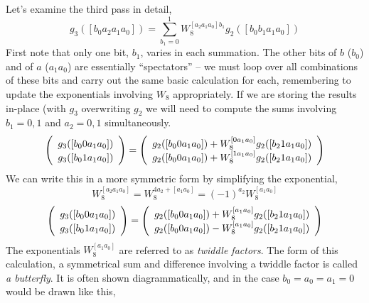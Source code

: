 \documentclass[fleqn,12pt]{article}
\begin{document}
Let's examine the third pass in detail,
%
\begin{equation}
g_3([b_0 a_2 a_1 a_0]) 
=
\sum_{b_1=0}^{1} W_8^{[a_2 a_1 a_0] b_1} g_2([b_0 b_1 a_1 a_0])
\end{equation}
%
First note that only one bit, $b_1$, varies in each summation.  The
other bits of $b$ ($b_0$) and of $a$ ($a_1 a_0$) are essentially
``spectators'' -- we must loop over all combinations of these bits and
carry out the same basic calculation for each, remembering to update
the exponentials involving $W_8$ appropriately.  If we are storing the
results in-place (with $g_3$ overwriting $g_2$ we will need to compute
the sums involving $b_1=0,1$ and $a_2=0,1$ simultaneously.
%
\begin{equation}
\left(
\begin{array}{c}
g_3([b_0 0 a_1 a_0]) \vphantom{W_8^{[]}} \\
g_3([b_0 1 a_1 a_0]) \vphantom{W_8^{[]}} 
\end{array}
\right)
=
\left(
\begin{array}{c}
g_2([b_0 0 a_1 a_0]) + W_8^{[0 a_1 a_0]} g_2([b_2 1 a_1 a_0]) \\
g_2([b_0 0 a_1 a_0]) + W_8^{[1 a_1 a_0]} g_2([b_2 1 a_1 a_0])
\end{array}
\right)
\end{equation}
%
We can write this in a more symmetric form by simplifying the exponential,
%
\begin{equation}
W_8^{[a_2 a_1 a_0]} 
= W_8^{4 a_2 + [a_1 a_0]} 
= (-1)^{a_2} W_8^{[a_1 a_0]}
\end{equation}
%
\begin{equation}
\left(
\begin{array}{c}
g_3([b_0 0 a_1 a_0]) \vphantom{W_8^{[]}} \\
g_3([b_0 1 a_1 a_0]) \vphantom{W_8^{[]}} 
\end{array}
\right)
=
\left(
\begin{array}{c}
g_2([b_0 0 a_1 a_0]) + W_8^{[a_1 a_0]} g_2([b_2 1 a_1 a_0]) \\
g_2([b_0 0 a_1 a_0]) - W_8^{[a_1 a_0]} g_2([b_2 1 a_1 a_0])
\end{array}
\right)
\end{equation}
%
The exponentials $W_8^{[a_1 a_0]}$ are referred to as {\em twiddle
factors}. The form of this calculation, a symmetrical sum and
difference involving a twiddle factor is called {\em a butterfly}.
It is often shown diagrammatically, and in the case $b_0=a_0=a_1=0$
would be drawn like this,
%
\end{document}
